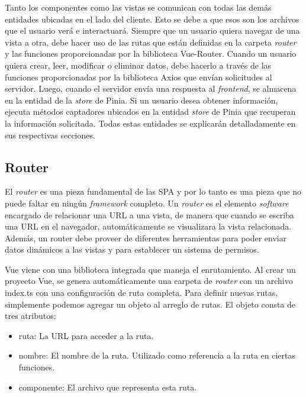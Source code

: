 
Tanto los componentes como las vistas se comunican con todas las demás entidades ubicadas en el lado del cliente. Esto se debe a que esos son los archivos que el usuario verá e interactuará. Siempre que un usuario quiera navegar de una vista a otra, debe hacer uso de las rutas que están definidas en la carpeta \textit{router} y las funciones proporcionadas por la biblioteca Vue-Router. Cuando un usuario quiera crear, leer, modificar o eliminar datos, debe hacerlo a través de las funciones proporcionadas por la biblioteca Axios que envían solicitudes al servidor. Luego, cuando el servidor envía una respuesta al \textit{frontend}, se almacena en la entidad de la \textit{store} de Pinia. Si un usuario desea obtener información, ejecuta métodos captadores ubicados en la entidad \textit{store} de Pinia que recuperan la información solicitada. Todas estas entidades se explicarán detalladamente en sus respectivas secciones.


\subsection{Router}
El \textit{router} es una pieza fundamental de las SPA y por lo tanto es una pieza que no puede faltar en ningún \textit{framework} completo. Un \textit{router} es el elemento \textit{software} encargado de relacionar una URL a una vista, de manera que cuando se escriba una URL en el navegador, automáticamente se visualizara la vista relacionada. Además, un router debe proveer de diferentes herramientas para poder enviar datos dinámicos a las vistas y para establecer un sistema de permisos.

Vue viene con una biblioteca integrada que maneja el enrutamiento. Al crear un proyecto Vue, se genera automáticamente una carpeta de \textit{router} con un archivo index.ts con una configuración de ruta completa. Para definir nuevas rutas, simplemente podemos agregar un objeto al arreglo de rutas. El objeto consta de tres atributos:

\begin{itemize}
\item ruta: La URL para acceder a la ruta.
\item nombre: El nombre de la ruta. Utilizado como referencia a la ruta en ciertas funciones.
\item componente: El archivo que representa esta ruta.
\end{itemize}

